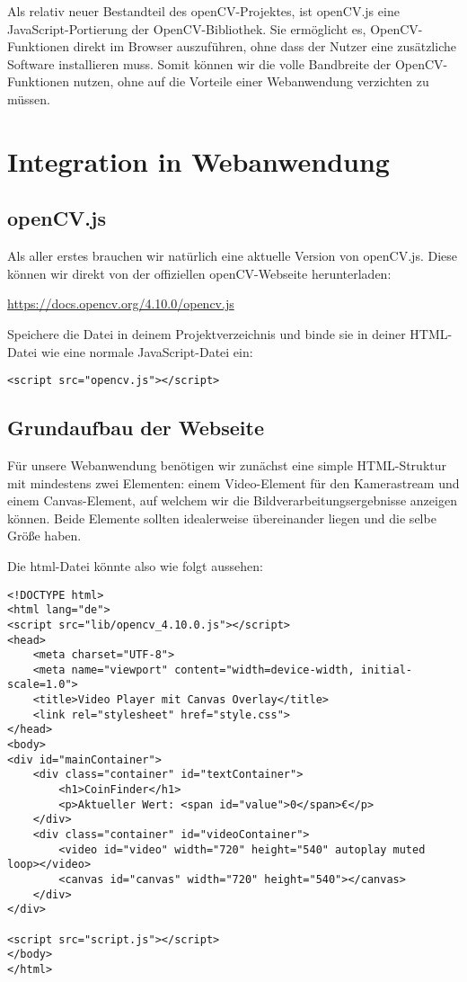 \documentclass{article}
\begin{document}
Als relativ neuer Bestandteil des openCV-Projektes, ist openCV.js eine JavaScript-Portierung der OpenCV-Bibliothek. Sie ermöglicht es, OpenCV-Funktionen direkt im Browser auszuführen, ohne dass der Nutzer eine zusätzliche Software installieren muss. Somit können wir die volle Bandbreite der OpenCV-Funktionen nutzen, ohne auf die Vorteile einer Webanwendung verzichten zu müssen.

\section{Integration in Webanwendung}
\subsection{openCV.js}
Als aller erstes brauchen wir natürlich eine aktuelle Version von openCV.js. Diese können wir direkt von der offiziellen openCV-Webseite herunterladen:

\href{https://docs.opencv.org/4.10.0/opencv.js}{https://docs.opencv.org/4.10.0/opencv.js}

Speichere die Datei in deinem Projektverzeichnis und binde sie in deiner HTML-Datei wie eine normale JavaScript-Datei ein:

\begin{lstlisting}[style=HTML]
<script src="opencv.js"></script>
\end{lstlisting}


\subsection{Grundaufbau der Webseite}
Für unsere Webanwendung benötigen wir zunächst eine simple HTML-Struktur mit mindestens zwei Elementen: einem Video-Element für den Kamerastream und einem Canvas-Element, auf welchem wir die Bildverarbeitungsergebnisse anzeigen können. Beide Elemente sollten idealerweise übereinander liegen und die selbe Größe haben.

Die html-Datei könnte also wie folgt aussehen:
\begin{lstlisting}[style=HTML]
<!DOCTYPE html>
<html lang="de">
<script src="lib/opencv_4.10.0.js"></script>
<head>
    <meta charset="UTF-8">
    <meta name="viewport" content="width=device-width, initial-scale=1.0">
    <title>Video Player mit Canvas Overlay</title>
    <link rel="stylesheet" href="style.css">
</head>
<body>
<div id="mainContainer">
    <div class="container" id="textContainer">
        <h1>CoinFinder</h1>
        <p>Aktueller Wert: <span id="value">0</span>€</p>
    </div>
    <div class="container" id="videoContainer">
        <video id="video" width="720" height="540" autoplay muted loop></video>
        <canvas id="canvas" width="720" height="540"></canvas>
    </div>
</div>

<script src="script.js"></script>
</body>
</html>
\end{lstlisting}
\end{document}
